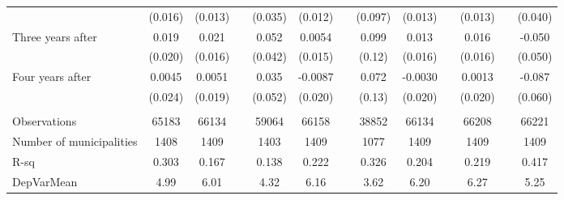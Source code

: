 \begin{tabular}{lcccccccccccc}
      & (0.016) & (0.013) &       & (0.035) & (0.012) &       & (0.097) & (0.013) &       & (0.013) &       & (0.040) \\
Three years after & 0.019 & 0.021 &       & 0.052 & 0.0054 &       & 0.099 & 0.013 &       & 0.016 &       & -0.050 \\
      & (0.020) & (0.016) &       & (0.042) & (0.015) &       & (0.12) & (0.016) &       & (0.016) &       & (0.050) \\
Four years after & 0.0045 & 0.0051 &       & 0.035 & -0.0087 &       & 0.072 & -0.0030 &       & 0.0013 &       & -0.087 \\
      & (0.024) & (0.019) &       & (0.052) & (0.020) &       & (0.13) & (0.020) &       & (0.020) &       & (0.060) \\
      &       &       &       &       &       &       &       &       &       &       &       &  \\
\midrule
Observations & 65183 & 66134 &       & 59064 & 66158 &       & 38852 & 66134 &       & 66208 &       & 66221 \\
Number of municipalities & 1408  & 1409  &       & 1403  & 1409  &       & 1077  & 1409  &       & 1409  &       & 1409 \\
R-sq  & 0.303 & 0.167 &       & 0.138 & 0.222 &       & 0.326 & 0.204 &       & 0.219 &       & 0.417 \\
DepVarMean & 4.99  & 6.01  &       & 4.32  & 6.16  &       & 3.62  & 6.20  &       & 6.27  &       & 5.25 \\
\bottomrule
\bottomrule
\end{tabular}%
